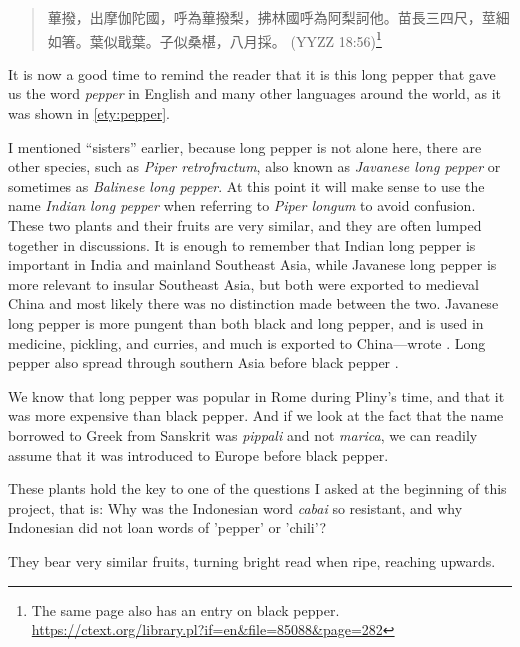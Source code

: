 \begin{quote}
    蓽撥，出摩伽陀國，呼為蓽撥梨，拂林國呼為阿梨訶他。苗長三四尺，莖細如箸。葉似戢葉。子似桑椹，八月採。 (\gls{YYZZ} 18:56)\footnote{The same page also has an entry on black pepper. \url{https://ctext.org/library.pl?if=en&file=85088&page=282}}
\end{quote}


It is now a good time to remind the reader that it is this long pepper that gave us the word \textit{pepper} in English and many other languages around the world, as it was shown in \ref{ety:pepper}. 

I mentioned ``sisters'' earlier, because long pepper is not alone here, there are other species, such as \textit{Piper retrofractum}, also known as \textit{Javanese long pepper} or sometimes as \textit{Balinese long pepper}. At this point it will make sense to use the name \textit{Indian long pepper} when referring to \textit{Piper longum} to avoid confusion. These two plants and their fruits are very similar, and they are often lumped together in discussions. It is enough to remember that Indian long pepper is important in India and mainland Southeast Asia, while Javanese long pepper is more relevant to insular Southeast Asia, but both were exported to medieval China and most likely there was no distinction made between the two. Javanese long pepper is more pungent than both black and long pepper, and is used in medicine, pickling, and curries, and much is exported to China---wrote \textcite{burkill_dictionary_1935}. Long pepper also spread through southern Asia before black pepper \parencite[1746-1751]{burkill_dictionary_1935}. 

We know that long pepper was popular in Rome during Pliny's time, and that it was more expensive than black pepper. And if we look at the fact that the name borrowed to Greek from Sanskrit was \textit{pippali} and not \textit{marica}, we can readily assume that it was introduced to Europe before black pepper.

These plants hold the key to one of the questions I asked at the beginning of this project, that is: Why was the Indonesian word \textit{cabai} so resistant, and why Indonesian did not loan words of 'pepper' or 'chili'?  

They bear very similar fruits, turning bright read when ripe, reaching upwards.  

